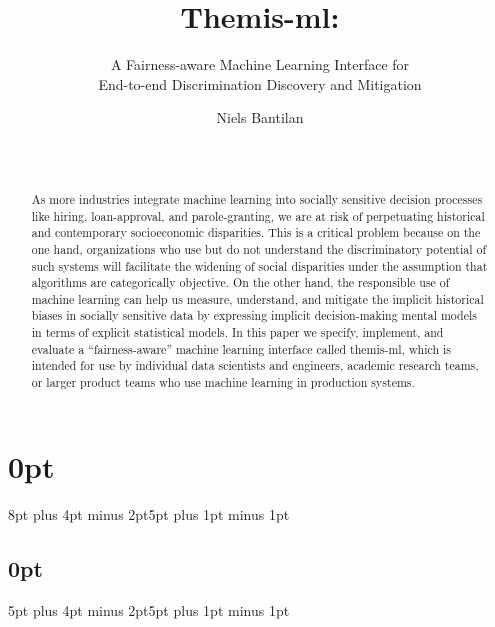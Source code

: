\documentclass{acm_proc_article-sp}
\begin{document}
\titlespacing\section{0pt}{8pt plus 4pt minus 2pt}{5pt plus 1pt minus 1pt}
\titlespacing\subsection{0pt}{5pt plus 4pt minus 2pt}{5pt plus 1pt minus 1pt}



\title{
  Themis-ml:
}
\subtitle{
    A Fairness-aware Machine Learning Interface for \\
    End-to-end Discrimination Discovery and Mitigation
}


\author{
\alignauthor
Niels Bantilan\\
       \\
       \\
}

\maketitle

\begin{abstract}
As more industries integrate machine learning into socially sensitive decision
processes like hiring, loan-approval, and parole-granting, we are at risk of
perpetuating historical and contemporary socioeconomic disparities. This is a
critical problem because on the one hand, organizations who use but do not
understand the discriminatory potential of such systems will facilitate the
widening of social disparities under the assumption that algorithms are
categorically objective. On the other hand, the responsible use of machine
learning can help us measure, understand, and mitigate the implicit historical
biases in socially sensitive data by expressing implicit decision-making mental
models in terms of explicit statistical models. In this paper we specify,
implement, and evaluate a ``fairness-aware'' machine learning interface called
themis-ml, which is intended for use by individual data scientists and
engineers, academic research teams, or larger product teams who use machine
learning in production systems.
\end{abstract}
\end{document}
